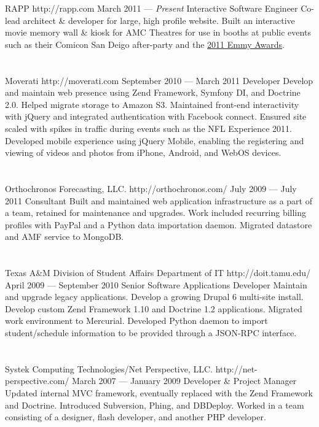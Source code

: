 \documentclass{resume}
\begin{document}
\employer
	{RAPP}
	{http://rapp.com}
	{March 2011 --- \emph{Present}}
	{Interactive Software Engineer}
	{Co-lead architect \& developer for large, high profile website. Built an interactive movie memory wall \& kiosk for AMC Theatres for use in booths at public events such as their Comicon San Deigo after-party and the \href{http://www.accesshollywood.com/backstage-at-the-emmys/emmys-2011-backstage-at-the-hp-touchsmart-gift-lounge-day-1_gallerytab_3129/20}{2011 Emmy Awards}.}
\\ \\ \\
\employer
	{Moverati}
	{http://moverati.com}
	{September 2010 --- March 2011}
	{Developer}
	{Develop and maintain web presence using Zend Framework, Symfony DI, and Doctrine 2.0. Helped migrate storage to Amazon S3. Maintained front-end interactivity with jQuery and integrated authentication with Facebook connect. Ensured site scaled with spikes in traffic during events such as the NFL Experience 2011. Developed mobile experience using jQuery Mobile, enabling the registering and viewing of videos and photos from iPhone, Android, and WebOS devices.}
\\ \\ \\
\employer
	{Orthochronos Forecasting, LLC.}
	{http://orthochronos.com/}
	{July 2009 --- July 2011}
	{Consultant}
	{Built and maintained web application infrastructure as a part of a team, retained for maintenance and upgrades. Work included recurring billing profiles with PayPal and a Python data importation daemon. Migrated datastore and AMF service to MongoDB.}
\\ \\ \\
\employer
	{Texas A\&M Division of Student Affairs Department of IT}
	{http://doit.tamu.edu/}
	{April 2009 --- September 2010}
	{Senior Software Applications Developer}
	{Maintain and upgrade legacy applications. Develop a growing Drupal 6 multi-site install. Develop custom Zend Framework 1.10 and Doctrine 1.2 applications. Migrated work environment to Mercurial. Developed Python daemon to import student/schedule information to be provided through a JSON-RPC interface.}
\\ \\ \\
\employer
	{Systek Computing Technologies/Net Perspective, LLC.}
	{http://net-perspective.com/}
	{March 2007 --- January 2009}
	{Developer \& Project Manager}
	{Updated internal MVC framework, eventually replaced with the Zend Framework and Doctrine. Introduced Subversion, Phing, and DBDeploy. Worked in a team consisting of a designer, flash developer, and another PHP developer.}
\end{document}
